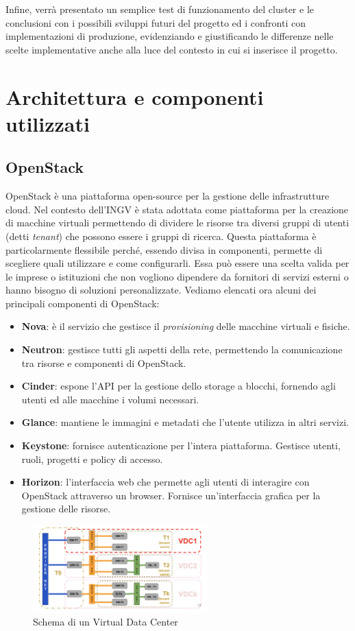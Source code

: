 \documentclass[12pt,a4paper,openright,twoside]{book}
\begin{document}
Infine, verrà presentato un semplice test di funzionamento del cluster e le conclusioni con i possibili sviluppi futuri del progetto ed i confronti con implementazioni di produzione, evidenziando e giustificando
le differenze nelle scelte implementative anche alla luce del contesto in cui si inserisce il progetto.
\chapter{Architettura e componenti utilizzati}
\section{OpenStack}
OpenStack è una piattaforma open-source per la gestione delle infrastrutture cloud. Nel contesto dell'INGV è stata adottata come piattaforma per la creazione di
macchine virtuali permettendo di dividere le risorse tra diversi gruppi di utenti (detti \textit{tenant}) che possono essere i gruppi di ricerca.
Questa piattaforma è particolarmente flessibile perché, essendo divisa in componenti, permette di scegliere quali utilizzare e come configurarli. Essa può essere
una scelta valida per le imprese o istituzioni che non vogliono dipendere da fornitori di servizi esterni o hanno bisogno di soluzioni personalizzate.
Vediamo elencati ora alcuni dei principali componenti di OpenStack\cite{amslaurea29330}:
%
%
\begin{itemize}
    \item \textbf{Nova}: è il servizio che gestisce il \textit{provisioning} delle macchine virtuali e fisiche. 
    \item \textbf{Neutron}: gestisce tutti gli aspetti della rete, permettendo la comunicazione tra risorse e componenti di OpenStack. 
    \item \textbf{Cinder}: espone l'API per la gestione dello storage a blocchi, fornendo agli utenti ed alle macchine i volumi necessari.
    \item \textbf{Glance}: mantiene le immagini e metadati che l'utente utilizza in altri servizi. 
    \item \textbf{Keystone}: fornisce autenticazione per l'intera piattaforma. Gestisce utenti, ruoli, progetti e policy di accesso.
    \item \textbf{Horizon}: l'interfaccia web che permette agli utenti di interagire con OpenStack attraverso un browser. Fornisce un'interfaccia grafica per la gestione delle risorse.
\end{itemize}
\begin{figure}
    \centering
    \includegraphics[width=0.6\textwidth]{figures/vdc-diagram.png}
    \caption{Schema di un Virtual Data Center}
    \label{fig:vdc}
\end{figure}
\end{document}
